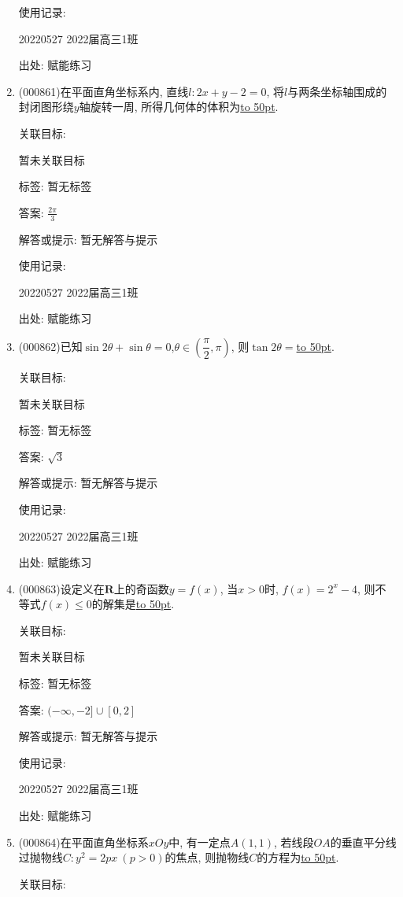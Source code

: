 \documentclass[10pt,a4paper]{article}
\newcommand{\blank}[1]{\underline{\hbox to #1pt{}}}
\begin{document}
\begin{enumerate}[1.]
使用记录:

20220527	2022届高三1班	


出处: 赋能练习
\item { (000861)}在平面直角坐标系内, 直线$l:2x+y-2=0$, 将$l$与两条坐标轴围成的封闭图形绕$y$轴旋转一周, 所得几何体的体积为\blank{50}.


关联目标:

暂未关联目标



标签: 暂无标签

答案: $\frac{2\pi}3$

解答或提示: 暂无解答与提示

使用记录:

20220527	2022届高三1班	


出处: 赋能练习
\item { (000862)}已知$\sin 2\theta +\sin\theta =0$,$\theta \in (\dfrac{\pi}2,\pi)$, 则$\tan 2\theta =$\blank{50}.


关联目标:

暂未关联目标



标签: 暂无标签

答案: $\sqrt 3$

解答或提示: 暂无解答与提示

使用记录:

20220527	2022届高三1班	


出处: 赋能练习
\item { (000863)}设定义在$\mathbf{R}$上的奇函数$y=f(x)$, 当$x>0$时, $f(x)=2^x-4$, 则不等式$f(x)\le 0$的解集是\blank{50}.


关联目标:

暂未关联目标



标签: 暂无标签

答案: $(-\infty, -2]\cup [0,2]$

解答或提示: 暂无解答与提示

使用记录:

20220527	2022届高三1班	


出处: 赋能练习
\item { (000864)}在平面直角坐标系$xOy$中, 有一定点$A(1,1)$, 若线段$OA$的垂直平分线过抛物线$C:y^2=2px \ (p>0)$的焦点, 则抛物线$C$的方程为\blank{50}.


关联目标:


\end{enumerate}
\end{document}
